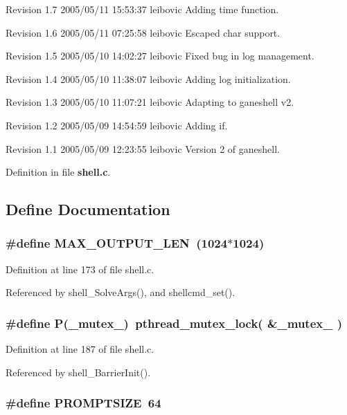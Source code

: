 Revision 1.7 2005/05/11 15:53:37 leibovic Adding time function.

Revision 1.6 2005/05/11 07:25:58 leibovic Escaped char support.

Revision 1.5 2005/05/10 14:02:27 leibovic Fixed bug in log management.

Revision 1.4 2005/05/10 11:38:07 leibovic Adding log initialization.

Revision 1.3 2005/05/10 11:07:21 leibovic Adapting to ganeshell v2.

Revision 1.2 2005/05/09 14:54:59 leibovic Adding if.

Revision 1.1 2005/05/09 12:23:55 leibovic Version 2 of ganeshell.

Definition in file {\bf shell.c}.

\subsection{Define Documentation}
\subsubsection{\setlength{\rightskip}{0pt plus 5cm}\#define MAX\_\-OUTPUT\_\-LEN\ (1024$\ast$1024)}\label{shell_8c_a0}




Definition at line 173 of file shell.c.

Referenced by shell\_\-Solve\-Args(), and shellcmd\_\-set().
\subsubsection{\setlength{\rightskip}{0pt plus 5cm}\#define P(\_\-mutex\_\-)\ pthread\_\-mutex\_\-lock( \&\_\-mutex\_\- )}\label{shell_8c_a3}




Definition at line 187 of file shell.c.

Referenced by shell\_\-Barrier\-Init().
\subsubsection{\setlength{\rightskip}{0pt plus 5cm}\#define PROMPTSIZE\ 64}\label{shell_8c_a2}




